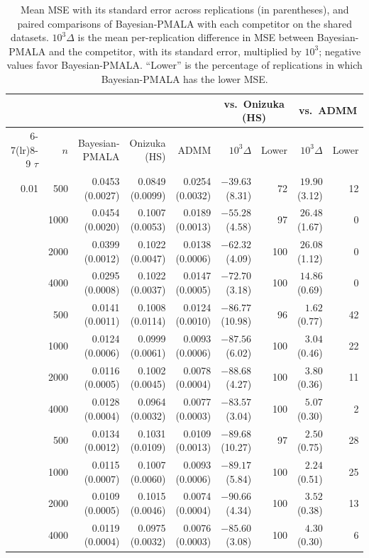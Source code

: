 \begin{table}[H]
\centering
\footnotesize
\setlength{\tabcolsep}{3pt}
\caption{Mean MSE with its standard error across replications (in parentheses), and paired comparisons of Bayesian-PMALA with each competitor on the shared datasets. $10^{3}\Delta$ is the mean per-replication difference in MSE between Bayesian-PMALA and the competitor, with its standard error, multiplied by $10^{3}$; negative values favor Bayesian-PMALA. ``Lower'' is the percentage of replications in which Bayesian-PMALA has the lower MSE.}
\label{tab:air_mse_se}
\begin{tabular}{@{}rrrrrrrrr@{}}
\toprule
 & & & & & \multicolumn{2}{c}{vs.\ Onizuka (HS)} & \multicolumn{2}{c}{vs.\ ADMM} \\
\cmidrule(lr){6-7}\cmidrule(lr){8-9}
$\tau$ & $n$ & Bayesian-PMALA & Onizuka (HS) & ADMM & $10^{3}\Delta$ & Lower & $10^{3}\Delta$ & Lower \\
\midrule
0.01 & 500 & 0.0453 (0.0027) & 0.0849 (0.0099) & 0.0254 (0.0032) & $-39.63$ (8.31) & 72 & $19.90$ (3.12) & 12 \\
 & 1000 & 0.0454 (0.0020) & 0.1007 (0.0053) & 0.0189 (0.0013) & $-55.28$ (4.58) & 97 & $26.48$ (1.67) & 0 \\
 & 2000 & 0.0399 (0.0012) & 0.1022 (0.0047) & 0.0138 (0.0006) & $-62.32$ (4.09) & 100 & $26.08$ (1.12) & 0 \\
 & 4000 & 0.0295 (0.0008) & 0.1022 (0.0037) & 0.0147 (0.0005) & $-72.70$ (3.18) & 100 & $14.86$ (0.69) & 0 \\
\addlinespace[3pt]
0.05 & 500 & 0.0141 (0.0011) & 0.1008 (0.0114) & 0.0124 (0.0010) & $-86.77$ (10.98) & 96 & $1.62$ (0.77) & 42 \\
 & 1000 & 0.0124 (0.0006) & 0.0999 (0.0061) & 0.0093 (0.0006) & $-87.56$ (6.02) & 100 & $3.04$ (0.46) & 22 \\
 & 2000 & 0.0116 (0.0005) & 0.1002 (0.0045) & 0.0078 (0.0004) & $-88.68$ (4.27) & 100 & $3.80$ (0.36) & 11 \\
 & 4000 & 0.0128 (0.0004) & 0.0964 (0.0032) & 0.0077 (0.0003) & $-83.57$ (3.04) & 100 & $5.07$ (0.30) & 2 \\
\addlinespace[3pt]
0.10 & 500 & 0.0134 (0.0012) & 0.1031 (0.0109) & 0.0109 (0.0013) & $-89.68$ (10.27) & 97 & $2.50$ (0.75) & 28 \\
 & 1000 & 0.0115 (0.0007) & 0.1007 (0.0060) & 0.0093 (0.0006) & $-89.17$ (5.84) & 100 & $2.24$ (0.51) & 25 \\
 & 2000 & 0.0109 (0.0005) & 0.1015 (0.0046) & 0.0074 (0.0004) & $-90.66$ (4.34) & 100 & $3.52$ (0.38) & 13 \\
 & 4000 & 0.0119 (0.0004) & 0.0975 (0.0032) & 0.0076 (0.0003) & $-85.60$ (3.08) & 100 & $4.30$ (0.30) & 6 \\
\bottomrule
\end{tabular}
\end{table}

